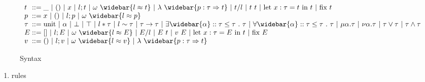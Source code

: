\documentclass[manuscript]{acmart}
\begin{document}
\begin{figure*}[h]
  \[
    \begin{array}{l @{} l}
      t 
      &{} ::=
      \begin{array}[t]{@{} l}
        \_ 
        \ |\ 
        () 
        \ |\ 
        x
        \ |\ 
        l;t 
        \ |\ 
        \omega\ \widebar{l \approx t}
        \ |\ 
        \lambda\ \widebar{p : \tau \Rightarrow t} 
        \ |\ 
        t/l
        \ |\ 
        t\ t
        \ |\ 
        \text{let } x : \tau = t\ \text{in } t
        \ |\ 
        \text{fix } t
      \end{array}
      \\
      p 
      &{} ::=
      \begin{array}[t]{@{} l}
        x 
        \ |\ 
        () 
        \ |\ 
        l;p
        \ |\ 
        \omega\ \widebar{l \approx p}
      \end{array}
      \\
      \tau
      &{} ::=
      \begin{array}[t]{@{} l}
        \text{unit} 
        \ |\ 
        \alpha 
        \ |\ 
        \bot 
        \ |\ 
        \top 
        \ |\ 
        l*\tau 
        \ |\ 
        l\sim\tau 
        \ |\ 
        \tau\rightarrow\tau 
        \ |\ 
        \exists \widebar{\alpha} :: \tau \leq \tau \ .\ \tau 
        \ |\ 
        \forall \widebar{\alpha} :: \tau \leq \tau \ .\ \tau 
        \ |\ 
        \mu \alpha.\tau 
        \ |\ 
        \nu \alpha.\tau 
        \ |\ 
        \tau \vee \tau
        \ |\ 
        \tau \wedge \tau
      \end{array}
      \\
      E 
      &{} ::=
      []
      \ |\ 
      l;E 
      \ |\ 
      \omega\ \widebar{l \approx E}
      \ |\ 
      E/l
      \ |\ 
      E\ t
      \ |\ 
      v\ E
      \ |\ 
      \text{let } x : \tau = E\ \text{in } t
      \ |\ 
      \text{fix } E 
      \\
      v 
      &{} ::=
      \begin{array}[t]{@{} l}
        () 
        \ |\ 
        l;v
        \ |\ 
        \omega\ \widebar{l \approx v}
        \ |\ 
        \lambda\ \widebar{p : \tau \Rightarrow t} 
      \end{array}
    \end{array}
  \]
  \caption{Syntax}
\end{figure*}






\begin{enumerate}
  \item rules 
\end{enumerate}
\end{document}
